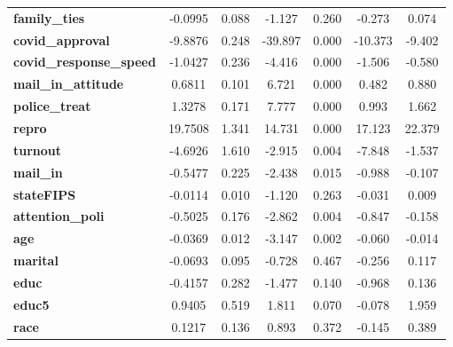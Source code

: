 \begin{center}
\begin{tabular}{lcccccc}
\textbf{family\_ties}           &      -0.0995  &        0.088     &    -1.127  &         0.260        &       -0.273    &        0.074     \\
\textbf{covid\_approval}        &      -9.8876  &        0.248     &   -39.897  &         0.000        &      -10.373    &       -9.402     \\
\textbf{covid\_response\_speed} &      -1.0427  &        0.236     &    -4.416  &         0.000        &       -1.506    &       -0.580     \\
\textbf{mail\_in\_attitude}     &       0.6811  &        0.101     &     6.721  &         0.000        &        0.482    &        0.880     \\
\textbf{police\_treat}          &       1.3278  &        0.171     &     7.777  &         0.000        &        0.993    &        1.662     \\
\textbf{repro}                  &      19.7508  &        1.341     &    14.731  &         0.000        &       17.123    &       22.379     \\
\textbf{turnout}                &      -4.6926  &        1.610     &    -2.915  &         0.004        &       -7.848    &       -1.537     \\
\textbf{mail\_in}               &      -0.5477  &        0.225     &    -2.438  &         0.015        &       -0.988    &       -0.107     \\
\textbf{stateFIPS}              &      -0.0114  &        0.010     &    -1.120  &         0.263        &       -0.031    &        0.009     \\
\textbf{attention\_poli}        &      -0.5025  &        0.176     &    -2.862  &         0.004        &       -0.847    &       -0.158     \\
\textbf{age}                    &      -0.0369  &        0.012     &    -3.147  &         0.002        &       -0.060    &       -0.014     \\
\textbf{marital}                &      -0.0693  &        0.095     &    -0.728  &         0.467        &       -0.256    &        0.117     \\
\textbf{educ}                   &      -0.4157  &        0.282     &    -1.477  &         0.140        &       -0.968    &        0.136     \\
\textbf{educ5}                  &       0.9405  &        0.519     &     1.811  &         0.070        &       -0.078    &        1.959     \\
\textbf{race}                   &       0.1217  &        0.136     &     0.893  &         0.372        &       -0.145    &        0.389     \\

\end{tabular}
\end{center}

